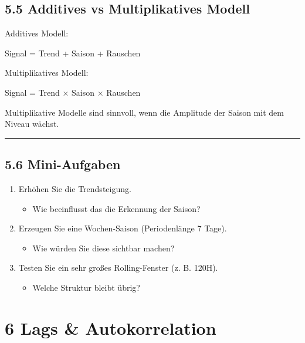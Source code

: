 \documentclass[
  ngerman,
  letterpaper,
  DIV=11]{scrreprt}
\providecommand{\tightlist}{%
  \setlength{\itemsep}{0pt}\setlength{\parskip}{0pt}}
\begin{document}
\section{5.5 Additives vs Multiplikatives
Modell}\label{additives-vs-multiplikatives-modell}

Additives Modell:

Signal = Trend + Saison + Rauschen

Multiplikatives Modell:

Signal = Trend × Saison × Rauschen

Multiplikative Modelle sind sinnvoll, wenn die Amplitude der Saison mit
dem Niveau wächst.

\begin{center}\rule{0.5\linewidth}{0.5pt}\end{center}

\section{5.6 Mini-Aufgaben}\label{mini-aufgaben-1}

\begin{enumerate}
\def\labelenumi{\arabic{enumi}.}
\tightlist
\item
  Erhöhen Sie die Trendsteigung.

  \begin{itemize}
  \tightlist
  \item
    Wie beeinflusst das die Erkennung der Saison?
  \end{itemize}
\item
  Erzeugen Sie eine Wochen-Saison (Periodenlänge 7 Tage).

  \begin{itemize}
  \tightlist
  \item
    Wie würden Sie diese sichtbar machen?
  \end{itemize}
\item
  Testen Sie ein sehr großes Rolling-Fenster (z. B. 120H).

  \begin{itemize}
  \tightlist
  \item
    Welche Struktur bleibt übrig?
  \end{itemize}
\end{enumerate}


\chapter{6 Lags \& Autokorrelation}\label{lags-autokorrelation}
\end{document}
